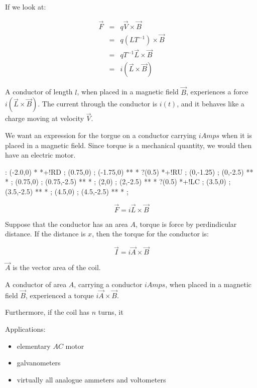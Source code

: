\documentclass[a4paper,12pt]{article}
\begin{document}
If we look at:

\begin{eqnarray*}
\vec{F} & = & q \vec{V} \times \vec{B} \\
		  & = & q (L T^{-1}) \times \vec{B} \\
		  & = & q T^{-1} \vec{L} \times \vec{B} \\
		  & = & i(\vec{L} \times \vec{B})
\end{eqnarray*}

A conductor of length $l$, when placed in a magnetic field $\vec{B}$,
experiences a force $i(\vec{L} \times \vec{B})$. The current through the
conductor is $i(t)$, and it behaves like a charge moving at velocity
$\vec{V}$.

We want an expression for the torgue on a conductor carrying $i Amps$
when it is placed in a magnetic field. Since torque is a mechanical
quantity, we would then have an electric motor.

\begin{table}[hbtp]

\xy <1cm, 0cm>:
(-2.0,0) * *+!RD{} ;
(0.75,0) ; (-1.75,0) **\dir{-} *\dir{>} ?(0.5) *+!RU{} ;
(0,-1.25) ; (0,-2.5) **\dir{-} *\dir{>} ;
(0.75,0) ; (0.75,-2.5) **\dir{-} *\dir{>} ;
(2,0) ; (2,-2.5) **\dir{-} *\dir{>} ?(0.5) *+!LC{} ;
(3.5,0) ; (3.5,-2.5) **\dir{-} *\dir{>} ;
(4.5,0) ; (4.5,-2.5) **\dir{-} *\dir{>} ;
\endxy

\end{table}

\[ \vec{F} = i \vec{L} \times \vec{B} \]

Suppose that the conductor has an area $A$, torque is force by
perdindicular distance. If the distance is $x$, then the torque for the
conductor is:

\[ \vec{I} = i \vec{A} \times \vec{B} \]

$\vec{A}$ is the vector area of the coil.

A conductor of area $A$, carrying a conductor $i Amps$, when placed in a
magnetic field $\vec{B}$, experienced a torque $i \vec{A} \times
\vec{B}$.

Furthermore, if the coil has $n$ turns, it %

Applications:

\begin{itemize}
\item elementary $AC$ motor

\item galvanometers

\item virtually all analogue ammeters and voltometers
\end{itemize}
\end{document}
